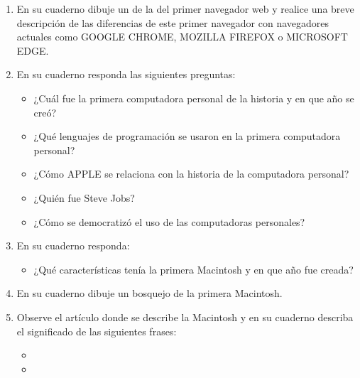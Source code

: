 \documentclass[letterpaper,10pt,spanish]{sphinxmanual}
\begin{document}
\begin{enumerate}
\item {} 
\sphinxAtStartPar
En su cuaderno dibuje un  de la  del primer navegador web  y realice una breve descripción de las diferencias de este primer navegador con navegadores actuales como GOOGLE CHROME, MOZILLA FIREFOX o MICROSOFT EDGE.

\item {} 
\sphinxAtStartPar
En su cuaderno responda las siguientes preguntas:
\begin{itemize}
\item {} 
\sphinxAtStartPar
¿Cuál fue la primera computadora personal de la historia y en que año se creó?

\item {} 
\sphinxAtStartPar
¿Qué lenguajes de programación se usaron en la primera computadora personal?

\item {} 
\sphinxAtStartPar
¿Cómo APPLE se relaciona con la historia de la computadora personal?

\item {} 
\sphinxAtStartPar
¿Quién fue Steve Jobs?

\item {} 
\sphinxAtStartPar
¿Cómo se democratizó el uso de las computadoras personales?

\end{itemize}

\item {} 
\sphinxAtStartPar
En su cuaderno responda:
\begin{itemize}
\item {} 
\sphinxAtStartPar
¿Qué características tenía la primera Macintosh y en que año fue creada?

\end{itemize}

\item {} 
\sphinxAtStartPar
En su cuaderno dibuje un bosquejo de la primera Macintosh.

\item {} 
\sphinxAtStartPar
Observe el artículo donde se describe la Macintosh y en su cuaderno describa el significado de las siguientes frases:
\begin{itemize}
\item {} 
\sphinxAtStartPar
{}

\item {} 
\sphinxAtStartPar
{}


\end{itemize}
\end{enumerate}
\end{document}
